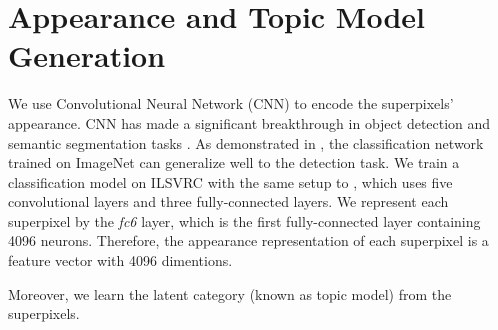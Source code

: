 \section{Appearance and Topic Model Generation}
\label{sec:appearancetopic}
We use Convolutional Neural Network (CNN) to encode the superpixels' appearance. CNN has made a significant breakthrough in object detection and semantic segmentation tasks \cite{girshick2013rich}. As demonstrated in \cite{girshick2013rich}, the classification network trained on ImageNet \cite{deng2009imagenet} can generalize well to the detection task. We train a classification model on ILSVRC with the same setup to \cite{girshick2013rich}, which uses five convolutional layers and three fully-connected layers. We represent each superpixel by the \textit{fc6} layer, which is the first fully-connected layer containing 4096 neurons. Therefore, the appearance representation of each superpixel is a feature vector with 4096 dimentions.

Moreover, we learn the latent category (known as topic model) from the superpixels.



